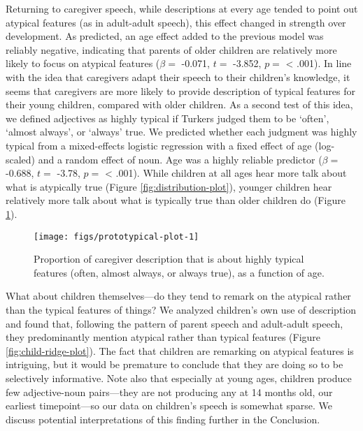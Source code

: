 \documentclass{ucetd}
\begin{document}
Returning to caregiver speech, while descriptions at every age tended to
point out atypical features (as in adult-adult speech), this effect
changed in strength over development. As predicted, an age effect added
to the previous model was reliably negative, indicating that parents of
older children are relatively more likely to focus on atypical features
(\(\beta =\) -0.071, \(t =\) -3.852, \(p =\) \textless{} .001). In line
with the idea that caregivers adapt their speech to their children's
knowledge, it seems that caregivers are more likely to provide
description of typical features for their young children, compared with
older children. As a second test of this idea, we defined adjectives as
highly typical if Turkers judged them to be `often', `almost always', or
`always' true. We predicted whether each judgment was highly typical
from a mixed-effects logistic regression with a fixed effect of age
(log-scaled) and a random effect of noun. Age was a highly reliable
predictor (\(\beta =\) -0.688, \(t =\) -3.78, \(p =\) \textless{} .001).
While children at all ages hear more talk about what is atypically true
(Figure \ref{fig:distribution-plot}), younger children hear relatively
more talk about what is typically true than older children do (Figure
\ref{fig:prototypical-plot}).

\begin{figure}[!tb]

{\centering \texttt{[image: figs/prototypical-plot-1]} 

}

\caption{Proportion of caregiver description that is about highly typical features (often, almost always, or always true), as a function of age.}\label{fig:prototypical-plot}
\end{figure}

What about children themselves---do they tend to remark on the atypical
rather than the typical features of things? We analyzed children's own
use of description and found that, following the pattern of parent
speech and adult-adult speech, they predominantly mention atypical
rather than typical features (Figure \ref{fig:child-ridge-plot}). The
fact that children are remarking on atypical features is intriguing, but
it would be premature to conclude that they are doing so to be
selectively informative. Note also that especially at young ages,
children produce few adjective-noun pairs---they are not producing any
at 14 months old, our earliest timepoint---so our data on children's
speech is somewhat sparse. We discuss potential interpretations of this
finding further in the Conclusion.
\end{document}
